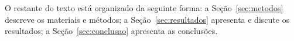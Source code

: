 O restante do texto está organizado da seguinte forma: a
Seção~\ref{sec:metodos} descreve os materiais e métodos; a
Seção~\ref{sec:resultados} apresenta e discute os resultados; a
Seção~\ref{sec:conclusao} apresenta as conclusões.
